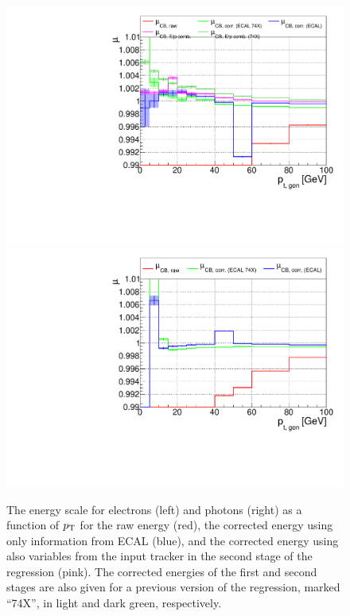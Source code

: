 \begin{figure}[hbtp]
  \begin{center}
    \includegraphics[width=\halflinewidth]{img/regression/pt100_scale_electrons.pdf}
    \includegraphics[width=\halflinewidth]{img/regression/pt100_scale_photons.pdf}
    \caption{
        The energy scale for electrons (left) and photons (right) as a function of $p_\mathrm{T}$ for the raw energy (red), the corrected energy using only information from ECAL (blue), and the corrected energy using also variables from the input tracker in the second stage of the regression (pink).
        The corrected energies of the first and second stages are also given for a previous version of the regression, marked ``74X'', in light and dark green, respectively.
        }
    \label{fig:pt100_scale}
  \end{center}
\end{figure}


